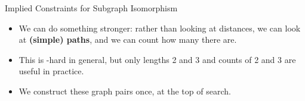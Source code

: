 \documentclass{beamer}
\begin{document}
\begin{frame}{Implied Constraints for Subgraph Isomorphism}
{
        \vspace{1em}
    }

     {
        \begin{itemize}
            \item We can do something stronger: rather than looking at distances, we can look at
                \textbf{(simple) paths}, and we can count how many there are.

            \item This is \NP-hard in general, but only lengths 2 and 3 and counts of 2 and 3 are
                useful in practice.

            \item We construct these graph pairs once, at the top of search.
        \end{itemize}
    }

\end{frame}
\end{document}
